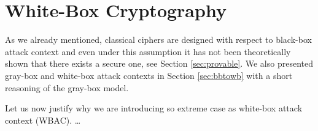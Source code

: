 
\section{White-Box Cryptography}



As we already mentioned, classical ciphers are designed with respect to black-box attack context and even under this assumption it has not been theoretically shown that there exists a secure one, see Section \ref{sec:provable}. We also presented gray-box and white-box attack contexts in Section \ref{sec:bbtowb} with a short reasoning of the gray-box model.

Let us now justify why we are introducing so extreme case as white-box attack context (WBAC). \ldots


